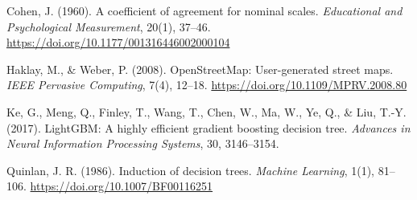 \documentclass[11pt,a4paper]{article}
\begin{document}
\hangindent=1.0cm 
Cohen, J. (1960). A coefficient of agreement for nominal scales. \textit{Educational and Psychological Measurement}, 20(1), 37--46. \url{https://doi.org/10.1177/001316446002000104}

\hangindent=1.0cm 
Haklay, M., \& Weber, P. (2008). OpenStreetMap: User-generated street maps. \textit{IEEE Pervasive Computing}, 7(4), 12--18. \url{https://doi.org/10.1109/MPRV.2008.80}

\hangindent=1.0cm 
Ke, G., Meng, Q., Finley, T., Wang, T., Chen, W., Ma, W., Ye, Q., \& Liu, T.-Y. (2017). LightGBM: A highly efficient gradient boosting decision tree. \textit{Advances in Neural Information Processing Systems}, 30, 3146--3154.

\hangindent=1.0cm 
Quinlan, J. R. (1986). Induction of decision trees. \textit{Machine Learning}, 1(1), 81--106. \url{https://doi.org/10.1007/BF00116251}

\endgroup
\end{document}
